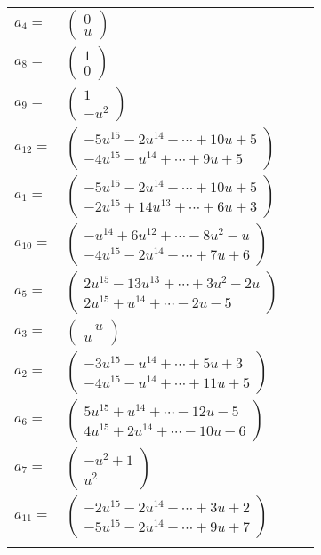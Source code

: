 \documentclass[1p]{elsarticle_modified}
\theoremstyle{definition}
\begin{document}
\begin{tabular}{m{7pt} m{180pt} m{7pt} m{180pt} }
\flushright $a_{4}=$&$\begin{pmatrix}0\\u\end{pmatrix}$ \\
\flushright $a_{8}=$&$\begin{pmatrix}1\\0\end{pmatrix}$ \\
\flushright $a_{9}=$&$\begin{pmatrix}1\\- u^2\end{pmatrix}$ \\
\flushright $a_{12}=$&$\begin{pmatrix}-5 u^{15}-2 u^{14}+\cdots+10 u+5\\-4 u^{15}- u^{14}+\cdots+9 u+5\end{pmatrix}$ \\
\flushright $a_{1}=$&$\begin{pmatrix}-5 u^{15}-2 u^{14}+\cdots+10 u+5\\-2 u^{15}+14 u^{13}+\cdots+6 u+3\end{pmatrix}$ \\
\flushright $a_{10}=$&$\begin{pmatrix}- u^{14}+6 u^{12}+\cdots-8 u^2- u\\-4 u^{15}-2 u^{14}+\cdots+7 u+6\end{pmatrix}$ \\
\flushright $a_{5}=$&$\begin{pmatrix}2 u^{15}-13 u^{13}+\cdots+3 u^2-2 u\\2 u^{15}+u^{14}+\cdots-2 u-5\end{pmatrix}$ \\
\flushright $a_{3}=$&$\begin{pmatrix}- u\\u\end{pmatrix}$ \\
\flushright $a_{2}=$&$\begin{pmatrix}-3 u^{15}- u^{14}+\cdots+5 u+3\\-4 u^{15}- u^{14}+\cdots+11 u+5\end{pmatrix}$ \\
\flushright $a_{6}=$&$\begin{pmatrix}5 u^{15}+u^{14}+\cdots-12 u-5\\4 u^{15}+2 u^{14}+\cdots-10 u-6\end{pmatrix}$ \\
\flushright $a_{7}=$&$\begin{pmatrix}- u^2+1\\u^2\end{pmatrix}$ \\
\flushright $a_{11}=$&$\begin{pmatrix}-2 u^{15}-2 u^{14}+\cdots+3 u+2\\-5 u^{15}-2 u^{14}+\cdots+9 u+7\end{pmatrix}$\\&\end{tabular}
\end{document}
